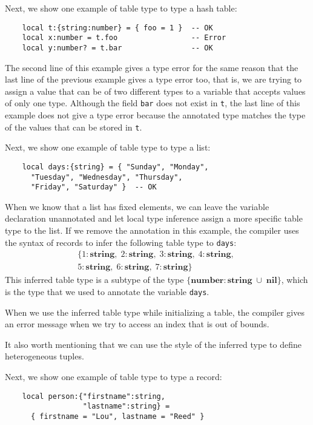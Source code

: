 \documentclass[preprint]{sig-alternate}
\newcommand{\Nil}{\mathbf{nil}}
\newcommand{\Number}{\mathbf{number}}
\newcommand{\String}{\mathbf{string}}
\begin{document}
Next, we show one example of table type to type a hash table:
\begin{verbatim}
    local t:{string:number} = { foo = 1 }  -- OK
    local x:number = t.foo                 -- Error
    local y:number? = t.bar                -- OK
\end{verbatim}

The second line of this example gives a type error for the same
reason that the last line of the previous example gives a type error
too, that is, we are trying to assign a value that can be of two
different types to a variable that accepts values of only one type.
Although the field \texttt{bar} does not exist in \texttt{t}, the last
line of this example does not give a type error because the
annotated type matches the type of the values that can be stored in
\texttt{t}.

Next, we show one example of table type to type a list:
\begin{verbatim}
    local days:{string} = { "Sunday", "Monday",
      "Tuesday", "Wednesday", "Thursday",
      "Friday", "Saturday" }  -- OK
\end{verbatim}

When we know that a list has fixed elements, we can leave the
variable declaration unannotated and let local type inference assign
a more specific table type to the list.
If we remove the annotation in this example, the compiler uses the
syntax of records to infer the following table type to \texttt{days}:
\begin{align*}
\{{1:\String},\;{2:\String},\;{3:\String},\;{4:\String},\;\\
{5:\String},\;{6:\String},\;{7:\String}\}
\end{align*}
This inferred table type is a subtype of the type
$\{\Number:\String\;\cup\;\Nil\}$, which is the type that we used to
annotate the variable \texttt{days}.

When we use the inferred table type while initializing a table, the
compiler gives an error message when we try to access an index that
is out of bounds.

It also worth mentioning that we can use the style of the inferred
type to define heterogeneous tuples.

Next, we show one example of table type to type a record:
\begin{verbatim}
    local person:{"firstname":string,
                  "lastname":string} =
      { firstname = "Lou", lastname = "Reed" } 
\end{verbatim}
\end{document}
